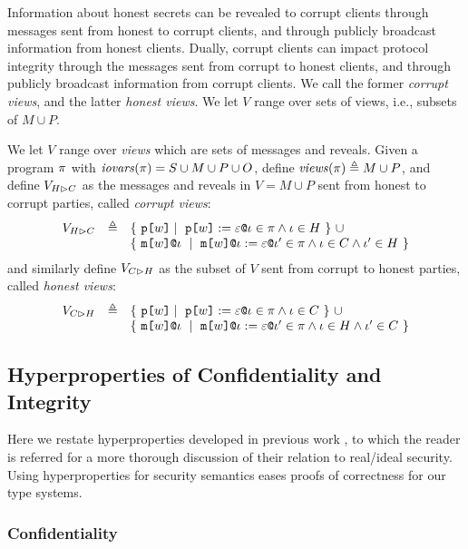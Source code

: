 Information about honest secrets can be revealed to corrupt clients
through messages sent from honest to corrupt clients, and through
publicly broadcast information from honest clients. Dually,
corrupt clients can impact protocol integrity through the messages
sent from corrupt to honest clients, and through publicly broadcast information
from corrupt clients. We call the former \emph{corrupt views}, and
the latter \emph{honest views}. We let $V$ range over sets
of views, i.e., subsets of $M \cup P$.
\begin{definition}
  We let $V$ range over \emph{views} which are sets of messages
  and reveals. Given a program $\pi$ with $\mathit{iovars}(\pi) = S \cup M \cup P \cup O$,
  define $\mathit{views}(\pi) \triangleq M \cup P$, and define $V_{H \rhd C}$ as
  the messages and reveals in $V = M \cup P$ sent from honest to corrupt
  parties, called \emph{corrupt views}:
  $$
  \begin{array}{lcl}
    \houtputs & \defeq
        & \{\ \rvl{w} \mid\ \reveal{w}{\be}{\cid} \in \prog \wedge \cid \in H \ \}\ \cup \\
      & & \{\ \elab{\mesg{w}}{\cid}\ \mid\  \eassign{\mesg{w}}{\cid}{\be}{\cid'} \in
           \prog \wedge \cid \in C \wedge \cid' \in H \ \} 
  \end{array}
  $$
  and similarly define $V_{C \rhd H}$ as the subset of $V$ sent from corrupt to honest
  parties, called \emph{honest views}:
  $$
  \begin{array}{lcl}
    \cinputs &  \defeq
        & \{\ \rvl{w} \mid\ \reveal{w}{\be}{\cid} \in \prog \wedge \cid \in C \ \} \ \cup\\
      & & \{\ \elab{\mesg{w}}{\cid}\ \mid\  \eassign{\mesg{w}}{\cid}{\be}{\cid'} \in
              \prog \wedge \cid \in H \wedge \cid' \in C \ \}
  \end{array}
  $$
\end{definition}

\subsection{Hyperproperties of Confidentiality and Integrity}

Here we restate hyperproperties developed in previous work
\cite{skalka-near-ppdp24}, to which the reader is referred for a more
thorough discussion of their relation to real/ideal security. Using
hyperproperties for security semantics eases proofs of
correctness for our type systems.

\subsubsection{Confidentiality}

